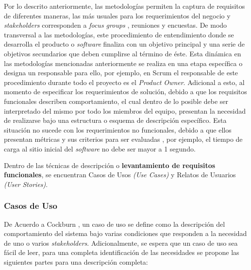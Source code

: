 Por lo descrito anteriormente, las metodologías permiten la captura de requisitos de diferentes maneras, las más usuales para los requerimientos del negocio y \textit{stakeholders} corresponden a \textit{focus groups} , reuniones y encuestas. De modo transversal a las metodologías, este procedimiento de entendimiento donde se desarrolla el producto o \textit{software} finaliza con un objetivo principal y una serie de objetivos secundarios que deben cumplirse al término de éste. Esta dinámica en las metodologías mencionadas anteriormente se realiza en una etapa específica o designa un responsable para ello, por ejemplo, en Scrum el responsable de este procedimiento durante todo el proyecto es el \textit{Product Owner}. Adicional a esto, al momento de especificar los requerimientos de solución, debido a que los requisitos funcionales describen comportamiento, el cual dentro de lo posible debe ser interpretado del mismo por todo los miembros del equipo, presentan la necesidad de realizarse bajo una estructura o esquema de descripción específico. Esta situación no sucede con los requerimientos no funcionales, debido a que ellos presentan métricas  y sus criterios para ser evaluadas , por ejemplo, el tiempo de carga al sitio inicial del \textit{software} no debe ser mayor a 1 segundo.

Dentro de las técnicas de descripción o \textbf{levantamiento de requisitos funcionales}, se encuentran Casos de Usos \textit{(Use Cases)} y Relatos de Usuarios \textit{(User Stories)}.

\subsubsection{Casos de Uso \label{sec:use_cases}}

De Acuerdo a Cockburn \cite{uses_cases_writing}, un caso de uso se define como la descripción del comportamiento del sistema bajo varias condiciones que responden a la necesidad de uno o varios \textit{stakeholders}. Adicionalmente, se espera que un caso de uso sea fácil de leer, para una completa identificación de las necesidades se propone las siguientes partes para una descripción completa:

